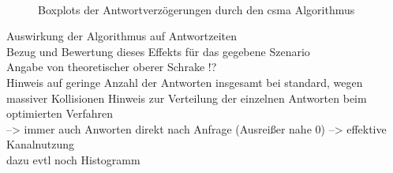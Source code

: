 \begin{figure}[bth]
        \myfloatalign
         \\
        \caption[Verzögerung]{Boxplots der Antwortverzögerungen durch den \gls{csma} Algorithmus}\label{fig:diag_delay_1_400}
\end{figure}

Auswirkung der Algorithmus auf Antwortzeiten \\
Bezug und Bewertung dieses Effekts für das gegebene Szenario\\
Angabe von theoretischer oberer Schrake !? \\
Hinweis auf geringe Anzahl der Antworten insgesamt bei standard, wegen massiver Kollisionen
Hinweis zur Verteilung der einzelnen Antworten beim optimierten Verfahren\\
--> immer auch Anworten direkt nach Anfrage (Ausreißer nahe 0) --> effektive Kanalnutzung \\
dazu evtl noch Histogramm








